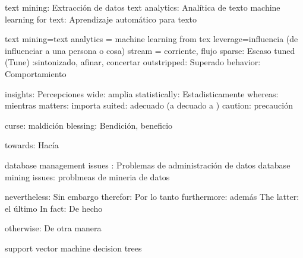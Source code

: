 




text mining: Extracción de datos
text analytics: Analítica de texto
machine learning for text: Aprendizaje automático para texto


text mining=text analytics = machine learning from tex
leverage=influencia (de influenciar a una persona o cosa)
stream = corriente, flujo
sparse: Escaso 
tuned (Tune) :sintonizado, afinar, concertar
outstripped: Superado
behavior: Comportamiento



insights: Percepciones
wide: amplia
statistically: Estadisticamente
whereas: mientras
matters: importa
suited: adecuado (a decuado a )
caution: precaución


curse: maldición
blessing: Bendición, beneficio

towards: Hacía


database management issues : Problemas de administración de datos
database mining issues: problmeas de mineria de datos


nevertheless: Sin embargo
therefor: Por lo tanto
furthermore: además
The latter: el último
In fact: De hecho



otherwise: De otra manera




support vector machine
decision trees 
